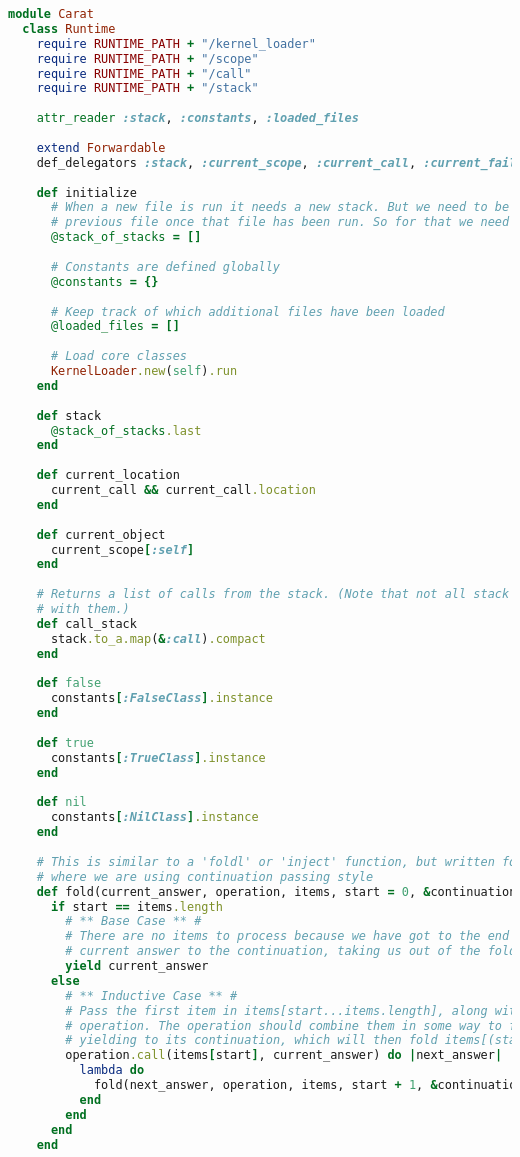 \begin{lstlisting}[title={\small\Helvetica runtime/runtime.rb},language=Ruby]
module Carat
  class Runtime
    require RUNTIME_PATH + "/kernel_loader"
    require RUNTIME_PATH + "/scope"
    require RUNTIME_PATH + "/call"
    require RUNTIME_PATH + "/stack"
    
    attr_reader :stack, :constants, :loaded_files
    
    extend Forwardable
    def_delegators :stack, :current_scope, :current_call, :current_failure_continuation
    
    def initialize
      # When a new file is run it needs a new stack. But we need to be able to return to the 
      # previous file once that file has been run. So for that we need a stack of stacks.
      @stack_of_stacks = []
      
      # Constants are defined globally
      @constants = {}
      
      # Keep track of which additional files have been loaded
      @loaded_files = []
      
      # Load core classes
      KernelLoader.new(self).run
    end
    
    def stack
      @stack_of_stacks.last
    end
    
    def current_location
      current_call && current_call.location
    end
    
    def current_object
      current_scope[:self]
    end
    
    # Returns a list of calls from the stack. (Note that not all stack frames have a call associated
    # with them.)
    def call_stack
      stack.to_a.map(&:call).compact
    end
    
    def false
      constants[:FalseClass].instance
    end
    
    def true
      constants[:TrueClass].instance
    end
    
    def nil
      constants[:NilClass].instance
    end
    
    # This is similar to a 'foldl' or 'inject' function, but written for this specific context
    # where we are using continuation passing style
    def fold(current_answer, operation, items, start = 0, &continuation)
      if start == items.length
        # ** Base Case ** #
        # There are no items to process because we have got to the end of the array, so yield the
        # current answer to the continuation, taking us out of the fold operation
        yield current_answer
      else
        # ** Inductive Case ** #
        # Pass the first item in items[start...items.length], along with the current answer, to the
        # operation. The operation should combine them in some way to form the next answer, before
        # yielding to its continuation, which will then fold items[(start+1)...items.length].
        operation.call(items[start], current_answer) do |next_answer|
          lambda do
            fold(next_answer, operation, items, start + 1, &continuation)
          end
        end
      end
    end
    

\end{lstlisting}
